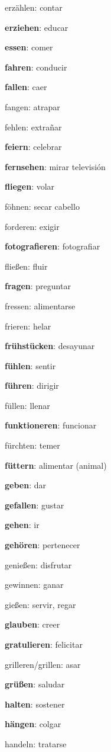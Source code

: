 \begin{multicols}{2}
\begin{myitemize}
\item erzählen: contar
\item \textbf{erziehen}: educar
\item \textbf{essen}: comer
\item \textbf{fahren}: conducir
\item \textbf{fallen}: caer
\item fangen: atrapar
\item fehlen: extrañar
\item \textbf{feiern}: celebrar
\item \textbf{fernsehen}: mirar televisión
\item \textbf{fliegen}: volar
\item föhnen: secar cabello
\item forderen: exigir
\item \textbf{fotografieren}: fotografiar
\item fließen: fluir
\item \textbf{fragen}: preguntar
\item fressen: alimentarse
\item frieren: helar
\item \textbf{frühstücken}: desayunar
\item \textbf{fühlen}: sentir
\item \textbf{führen}: dirigir
\item füllen: llenar
\item \textbf{funktioneren}: funcionar
\item fürchten: temer
\item \textbf{füttern}: alimentar (animal)
\item \textbf{geben}: dar
\item \textbf{gefallen}: gustar
\item \textbf{gehen}: ir
\item \textbf{gehören}: pertenecer
\item genießen: disfrutar
\item gewinnen: ganar
\item gießen: servir, regar
\item \textbf{glauben}: creer
\item \textbf{gratulieren}: felicitar
\item grilleren/grillen: asar
\item \textbf{grüßen}: saludar
\item \textbf{halten}: sostener
\item \textbf{hängen}: colgar
\item handeln: tratarse

\end{myitemize}
\end{multicols}
